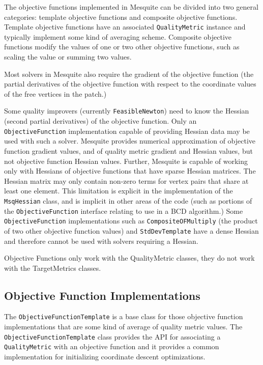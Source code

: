 The objective functions implemented in Mesquite can be divided into two general categories: template objective functions and composite objective functions.  Template objective functions have an associated \texttt{QualityMetric} instance and typically implement some kind of averaging scheme.  Composite objective functions modify the values of one or two other objective functions, such as scaling the value or summing two values.

Most solvers in Mesquite also require the gradient of the objective function (the partial derivatives of the objective function with respect to the coordinate values of the free vertices in the patch.)  

\label{sec:Hessian} Some quality improvers (currently \texttt{FeasibleNewton}) need to know the Hessian (second partial derivatives) of the objective function.  Only an \texttt{ObjectiveFunction} implementation capable of providing Hessian data may be used with such a solver.  Mesquite provides numerical approximation of objective function gradient values, and of quality metric gradient and Hessian values, but not objective function Hessian values.  Further, Mesquite is capable of working only with Hessians of objective functions that have sparse Hessian matrices.  The Hessian matrix may only contain non-zero terms for vertex pairs that share at least one element.  This limitation is explicit in the implementation of the \texttt{MsqHessian} class, and is implicit in other areas of the code (such as portions of the \texttt{ObjectiveFunction} interface relating to use in a BCD algorithm.)  Some \texttt{ObjectiveFunction} implementations such as \texttt{CompositeOFMultiply} (the product of two other objective function values) and \texttt{StdDevTemplate} have a dense Hessian and therefore cannot be used with solvers requiring a Hessian.

Objective Functions only work with the QualityMetric classes, they do not work with the TargetMetrics classes.

\subsection{Objective Function Implementations}
\label{sec:objfunc_impl}

The \texttt{ObjectiveFunctionTemplate} is a base class for those objective function implementations that are some kind of average of quality metric values.  The \texttt{ObjectiveFunctionTemplate} class provides the API for associating a \texttt{QualityMetric} with an objective function and it provides a common implementation for initializing coordinate descent optimizations.

